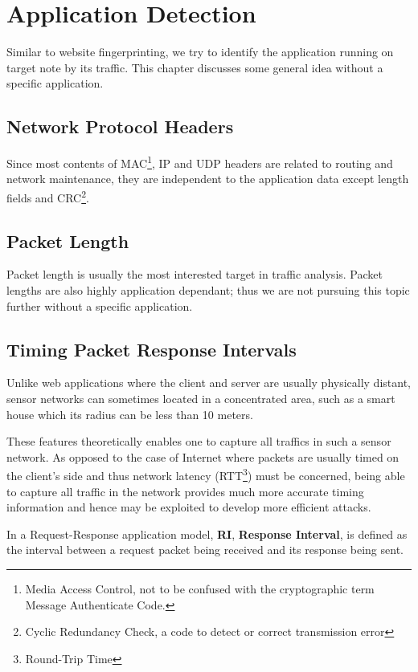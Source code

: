 \chapter{Application Detection} \label{Chp: Appdetect}
Similar to website fingerprinting, we try to identify the application running on target note by its traffic. This chapter discusses some general idea without a specific application.

\section{Network Protocol Headers}
Since most contents of MAC\footnote{Media Access Control, not to be confused with the cryptographic term Message Authenticate Code.}, IP and UDP headers are related to routing and network maintenance, they are independent to the application data except length fields and CRC\footnote{Cyclic Redundancy Check, a code to detect or correct transmission error}. 

\section{Packet Length}
Packet length is usually the most interested target in traffic analysis. Packet lengths are also highly application dependant; thus we are not pursuing this topic further without a specific application.

\section{Timing Packet Response Intervals}
Unlike web applications where the client and server are usually physically distant, sensor networks can sometimes located in a concentrated area, such as a smart house which its radius can be less than 10 meters. 

These features theoretically enables one to capture all traffics in such a sensor network. As opposed to the case of Internet where packets are usually timed on the client’s side and thus network latency (RTT\footnote{Round-Trip Time}) must be concerned, being able to capture all traffic in the network provides  much more accurate timing information and hence may be exploited to develop more efficient attacks.

\begin{definition}
In a Request-Response application model, \textbf{RI}, {\bf Response Interval}, is defined as the interval between a request packet being received and its response being sent.
\end{definition}

